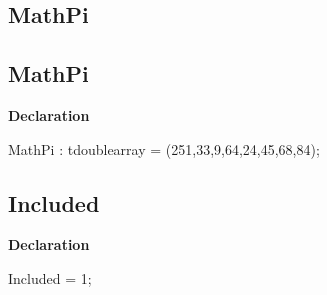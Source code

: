 \documentclass{report}
\newif\ifpdf
\begin{document}
\subsection*{\large{\textbf{MathPi}}\normalsize\hspace{1ex}\hrulefill}
\else
\subsection*{MathPi}
\fi
\label{ok_if_directive-MathPi}
\begin{list}{}{
\setlength{\itemindent}{0cm}
\setlength{\listparindent}{0cm}
\setlength{\leftmargin}{\evensidemargin}
\addtolength{\leftmargin}{\tmplength}
\settowidth{\labelsep}{X}
\addtolength{\leftmargin}{\labelsep}
\setlength{\labelwidth}{\tmplength}
}
\item[\textbf{Declaration}\hfill]
\ifpdf
\begin{flushleft}
\fi
\begin{ttfamily}
MathPi : tdoublearray =  (251,33,9,64,24,45,68,84);\end{ttfamily}

\ifpdf
\end{flushleft}
\fi

\end{list}
\ifpdf
\subsection*{\large{\textbf{Included}}\normalsize\hspace{1ex}\hrulefill}
\else
\subsection*{Included}
\fi
\label{ok_if_directive-Included}
\begin{list}{}{
\setlength{\itemindent}{0cm}
\setlength{\listparindent}{0cm}
\setlength{\leftmargin}{\evensidemargin}
\addtolength{\leftmargin}{\tmplength}
\settowidth{\labelsep}{X}
\addtolength{\leftmargin}{\labelsep}
\setlength{\labelwidth}{\tmplength}
}
\item[\textbf{Declaration}\hfill]
\ifpdf
\begin{flushleft}
\fi
\begin{ttfamily}
Included = 1;\end{ttfamily}

\ifpdf
\end{flushleft}
\fi

\end{list}
\end{document}
